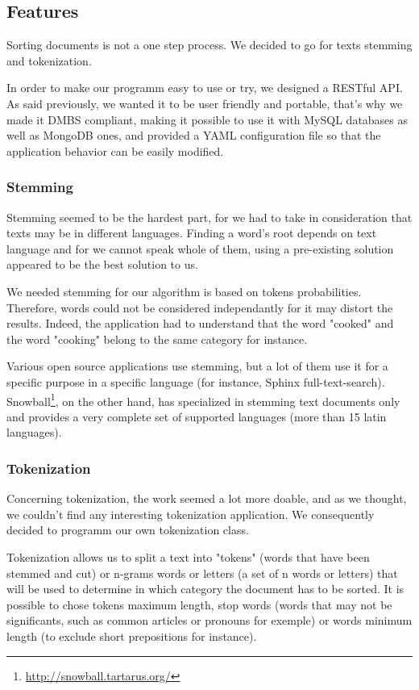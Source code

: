 \documentclass[a4paper,11pt]{article}
\begin{document}
\subsection{Features}

Sorting documents is not a one step process. We decided to go for texts
stemming and tokenization.

In order to make our programm easy to use or try, we designed a RESTful API.
As said previously, we wanted it to be user friendly and portable, that's why
we made it DMBS compliant, making it possible to use it with MySQL databases
as well as MongoDB ones, and provided a YAML configuration file so that the
application behavior can be easily modified.

\subsubsection{Stemming}

Stemming seemed to be the hardest part, for we had to take in consideration
that texts may be in different languages. Finding a word's root depends on
text language and for we cannot speak whole of them, using a pre-existing
solution appeared to be the best solution to us.

We needed stemming for our algorithm is based on tokens probabilities.
Therefore, words could not be considered independantly for it may distort
the results. Indeed, the application had to understand that the word "cooked"
and the word "cooking" belong to the same category for instance.

Various open source applications use stemming, but a lot of them use it for
a specific purpose in a specific language (for instance, Sphinx
full-text-search). Snowball\footnote{\url{http://snowball.tartarus.org/}},
on the other hand, has specialized in
stemming text documents only and provides a very complete set of supported
languages (more than 15 latin languages).

\subsubsection{Tokenization}

Concerning tokenization, the work seemed a lot more doable, and as we
thought, we couldn't find any interesting tokenization application. We
consequently decided to programm our own tokenization class.

Tokenization allows us to split a text into "tokens" (words that have
been stemmed and cut) or n-grams words or letters (a set of n words or
letters) that will be used to determine in which category the document has to
 be sorted. It is possible to chose tokens maximum length, stop words (words
that may not be significants, such as common articles or pronouns for
exemple) or words minimum length (to exclude short prepositions for
instance).
\end{document}
